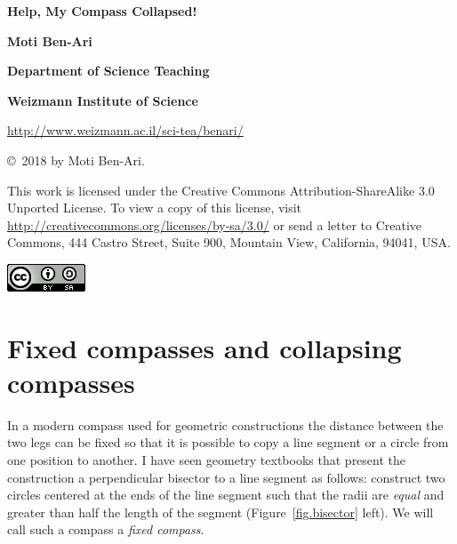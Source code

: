 \documentclass[11pt,a4paper]{article}
\begin{document}
\thispagestyle{empty}

\begin{center}

\textbf{\huge Help, My Compass Collapsed!}

\bigskip
\bigskip
\bigskip

\textbf{\LARGE Moti Ben-Ari}

\bigskip

\textbf{\Large Department of Science Teaching}

\bigskip

\textbf{\Large Weizmann Institute of Science}

\bigskip

\url{http://www.weizmann.ac.il/sci-tea/benari/}

\end{center}

\bigskip
\bigskip

\begin{center}
\copyright{}\  2018 by Moti Ben-Ari.
\end{center}

This work is licensed under the Creative Commons Attribution-ShareAlike 3.0 Unported License. To view a copy of this license, visit \url{http://creativecommons.org/licenses/by-sa/3.0/} or send a letter to Creative Commons, 444 Castro Street, Suite 900, Mountain View, California, 94041, USA.

\bigskip

\begin{center}
\includegraphics[width=.2\textwidth]{../by-sa.png}
\end{center}

\newpage


\section{Fixed compasses and collapsing compasses}

In a modern compass used for geometric constructions the distance between the two legs can be fixed so that it is possible to copy a line segment or a circle from one position to another. I have seen geometry textbooks that present the  construction a perpendicular bisector to a line segment as follows: construct two circles centered at the ends of the line segment such that the radii are \emph{equal} and greater than half the length of the segment (Figure~\ref{fig.bisector} left). We will call such a compass a \emph{fixed compass}.
\end{document}
